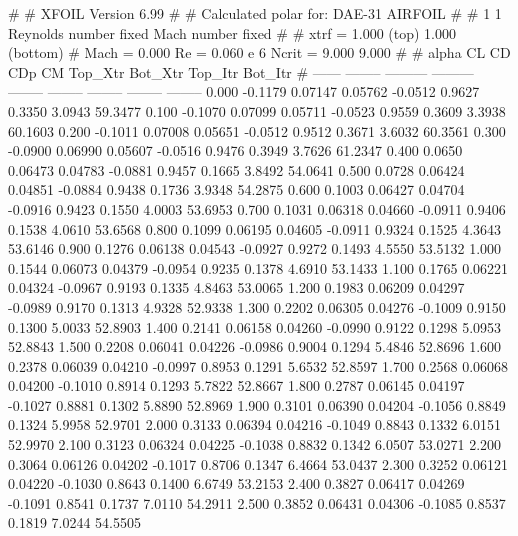 #  
#       XFOIL         Version 6.99
#  
# Calculated polar for: DAE-31 AIRFOIL                                  
#  
# 1 1 Reynolds number fixed          Mach number fixed         
#  
# xtrf =   1.000 (top)        1.000 (bottom)  
# Mach =   0.000     Re =     0.060 e 6     Ncrit =   9.000  9.000
#  
#   alpha    CL        CD       CDp       CM     Top_Xtr  Bot_Xtr  Top_Itr  Bot_Itr
#  ------ -------- --------- --------- -------- -------- -------- -------- --------
   0.000  -0.1179   0.07147   0.05762  -0.0512   0.9627   0.3350   3.0943  59.3477
   0.100  -0.1070   0.07099   0.05711  -0.0523   0.9559   0.3609   3.3938  60.1603
   0.200  -0.1011   0.07008   0.05651  -0.0512   0.9512   0.3671   3.6032  60.3561
   0.300  -0.0900   0.06990   0.05607  -0.0516   0.9476   0.3949   3.7626  61.2347
   0.400   0.0650   0.06473   0.04783  -0.0881   0.9457   0.1665   3.8492  54.0641
   0.500   0.0728   0.06424   0.04851  -0.0884   0.9438   0.1736   3.9348  54.2875
   0.600   0.1003   0.06427   0.04704  -0.0916   0.9423   0.1550   4.0003  53.6953
   0.700   0.1031   0.06318   0.04660  -0.0911   0.9406   0.1538   4.0610  53.6568
   0.800   0.1099   0.06195   0.04605  -0.0911   0.9324   0.1525   4.3643  53.6146
   0.900   0.1276   0.06138   0.04543  -0.0927   0.9272   0.1493   4.5550  53.5132
   1.000   0.1544   0.06073   0.04379  -0.0954   0.9235   0.1378   4.6910  53.1433
   1.100   0.1765   0.06221   0.04324  -0.0967   0.9193   0.1335   4.8463  53.0065
   1.200   0.1983   0.06209   0.04297  -0.0989   0.9170   0.1313   4.9328  52.9338
   1.300   0.2202   0.06305   0.04276  -0.1009   0.9150   0.1300   5.0033  52.8903
   1.400   0.2141   0.06158   0.04260  -0.0990   0.9122   0.1298   5.0953  52.8843
   1.500   0.2208   0.06041   0.04226  -0.0986   0.9004   0.1294   5.4846  52.8696
   1.600   0.2378   0.06039   0.04210  -0.0997   0.8953   0.1291   5.6532  52.8597
   1.700   0.2568   0.06068   0.04200  -0.1010   0.8914   0.1293   5.7822  52.8667
   1.800   0.2787   0.06145   0.04197  -0.1027   0.8881   0.1302   5.8890  52.8969
   1.900   0.3101   0.06390   0.04204  -0.1056   0.8849   0.1324   5.9958  52.9701
   2.000   0.3133   0.06394   0.04216  -0.1049   0.8843   0.1332   6.0151  52.9970
   2.100   0.3123   0.06324   0.04225  -0.1038   0.8832   0.1342   6.0507  53.0271
   2.200   0.3064   0.06126   0.04202  -0.1017   0.8706   0.1347   6.4664  53.0437
   2.300   0.3252   0.06121   0.04220  -0.1030   0.8643   0.1400   6.6749  53.2153
   2.400   0.3827   0.06417   0.04269  -0.1091   0.8541   0.1737   7.0110  54.2911
   2.500   0.3852   0.06431   0.04306  -0.1085   0.8537   0.1819   7.0244  54.5505
